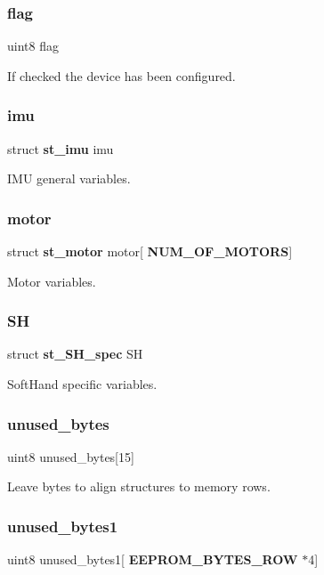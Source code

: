 \subsubsection{flag}
{\footnotesize\ttfamily uint8 flag}

If checked the device has been configured. \mbox{\label{structst__eeprom_a5587b913fbf50df4c3a5148dd8aab649}} 
\subsubsection{imu}
{\footnotesize\ttfamily struct \textbf{ st\+\_\+imu} imu}

I\+MU general variables. \mbox{\label{structst__eeprom_abe01764856595b55e98fe187ae4c9b54}} 
\subsubsection{motor}
{\footnotesize\ttfamily struct \textbf{ st\+\_\+motor} motor[\textbf{ N\+U\+M\+\_\+\+O\+F\+\_\+\+M\+O\+T\+O\+RS}]}

Motor variables. \mbox{\label{structst__eeprom_a48c2a3988657edd4d6b92f84a0d9d2d0}} 
\subsubsection{SH}
{\footnotesize\ttfamily struct \textbf{ st\+\_\+\+S\+H\+\_\+spec} SH}

Soft\+Hand specific variables. \mbox{\label{structst__eeprom_a23db079f0c6d3e264be3fb547f32403c}} 
\subsubsection{unused\+\_\+bytes}
{\footnotesize\ttfamily uint8 unused\+\_\+bytes[15]}

Leave bytes to align structures to memory rows. \mbox{\label{structst__eeprom_a0299e605ae8eb46c7aa7886e6b302a0f}} 
\subsubsection{unused\+\_\+bytes1}
{\footnotesize\ttfamily uint8 unused\+\_\+bytes1[\textbf{ E\+E\+P\+R\+O\+M\+\_\+\+B\+Y\+T\+E\+S\+\_\+\+R\+OW} $\ast$4]}

